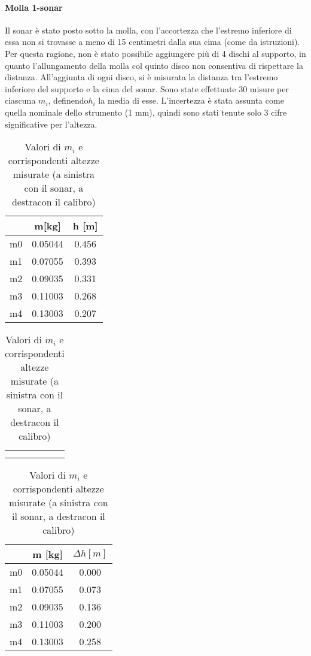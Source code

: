 \documentclass{article}
\begin{document}
\paragraph{Molla 1-sonar}
Il sonar è stato posto sotto la molla, con l'accortezza che l'estremo inferiore di essa non si trovasse a meno di 15 centimetri dalla sua cima (come da istruzioni). Per questa ragione, non è stato possibile aggiungere più di 4 dischi al supporto, in quanto l'allungamento della molla col quinto disco non consentiva di rispettare la distanza. All’aggiunta di ogni disco, si è misurata la distanza tra l'estremo inferiore del supporto e la cima del sonar. Sono state effettuate 30 misure per ciascuna $m_i$, definendo$ h_i$ la media di esse. L'incertezza è stata assunta come quella nominale dello strumento (1 mm), quindi sono stati tenute solo 3 cifre significative per l'altezza. 


\begin{table}[h]
    \begin{tabular}{|c|c|c|}
    \hline
      &  m[kg] & 	h [m] \\
        \hline
m0&0.05044	&	0.456\\
        \hline

m1 & 0.07055	&	0.393\\
        \hline

m2 &0.09035	&	0.331\\
        \hline

m3 &0.11003	&	0.268\\
        \hline
m4 & 0.13003	&	0.207\\
\hline
    \end{tabular}
      \begin{tabular}{c|c}
         &  \\
         & 
    \end{tabular}
     \begin{tabular}{|c|c|c|}
     \hline
     & m [kg]& $\Delta h [m]$ \\
       \hline
        m0	& 0.05044	&	0.000\\ 
          \hline
m1	&0.07055	&	0.073\\
  \hline
m2 &	0.09035&0.136\\
  \hline
m3 &	0.11003	&	0.200\\
  \hline
m4	&0.13003	&	0.258\\
  \hline




    \end{tabular}
    \caption{Valori di $m_i$ e corrispondenti altezze misurate (a sinistra con il sonar, a destracon il calibro)}
    \label{tab:my_label}
\end{table}
\end{document}
